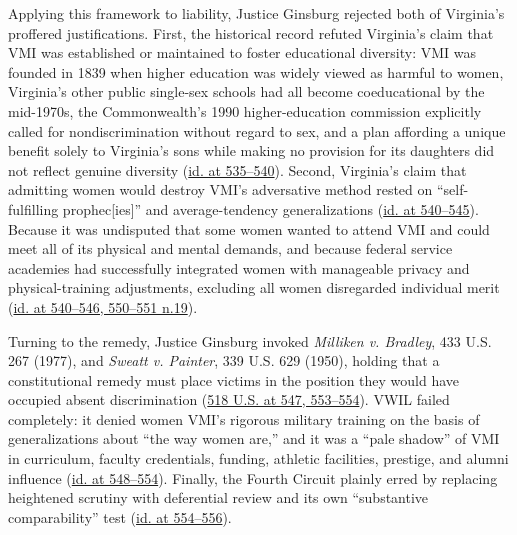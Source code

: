 \documentclass[12pt]{article}
\begin{document}
Applying this framework to liability, Justice Ginsburg rejected both of Virginia's proffered justifications. First, the historical record refuted Virginia's claim that VMI was established or maintained to foster educational diversity: VMI was founded in 1839 when higher education was widely viewed as harmful to women, Virginia's other public single-sex schools had all become coeducational by the mid-1970s, the Commonwealth's 1990 higher-education commission explicitly called for nondiscrimination without regard to sex, and a plan affording a unique benefit solely to Virginia's sons while making no provision for its daughters did not reflect genuine diversity (\href{https://supreme.justia.com/cases/federal/us/518/515/}{id. at 535--540}). Second, Virginia's claim that admitting women would destroy VMI's adversative method rested on ``self-fulfilling prophec[ies]'' and average-tendency generalizations (\href{https://supreme.justia.com/cases/federal/us/518/515/}{id. at 540--545}). Because it was undisputed that some women wanted to attend VMI and could meet all of its physical and mental demands, and because federal service academies had successfully integrated women with manageable privacy and physical-training adjustments, excluding all women disregarded individual merit (\href{https://supreme.justia.com/cases/federal/us/518/515/}{id. at 540--546, 550--551 n.19}).

Turning to the remedy, Justice Ginsburg invoked \textit{Milliken v. Bradley}, 433 U.S. 267 (1977), and \textit{Sweatt v. Painter}, 339 U.S. 629 (1950), holding that a constitutional remedy must place victims in the position they would have occupied absent discrimination (\href{https://supreme.justia.com/cases/federal/us/518/515/}{518 U.S. at 547, 553--554}). VWIL failed completely: it denied women VMI's rigorous military training on the basis of generalizations about ``the way women are,'' and it was a ``pale shadow'' of VMI in curriculum, faculty credentials, funding, athletic facilities, prestige, and alumni influence (\href{https://supreme.justia.com/cases/federal/us/518/515/}{id. at 548--554}). Finally, the Fourth Circuit plainly erred by replacing heightened scrutiny with deferential review and its own ``substantive comparability'' test (\href{https://supreme.justia.com/cases/federal/us/518/515/}{id. at 554--556}).
\end{document}
